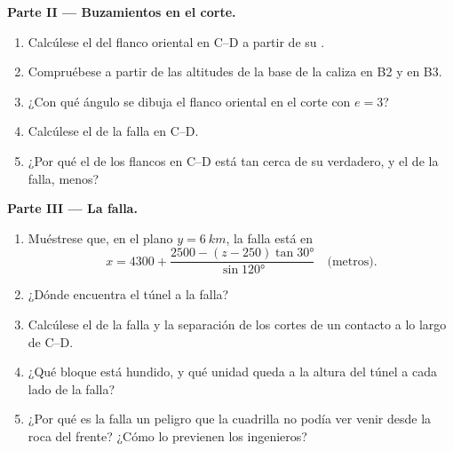 \begin{problem}
\medskip
\noindent\textbf{Parte II --- Buzamientos en el corte.}
\begin{enumerate}[resume]
  \item Calcúlese el  del flanco oriental en C--D a partir de su .
  \item Compruébese a partir de las altitudes de la base de la caliza en B2 y en B3.
  \item ¿Con qué ángulo se dibuja el flanco oriental en el corte con $e = 3$?
  \item Calcúlese el  de la falla en C--D.
  \item ¿Por qué el  de los flancos en C--D está tan cerca de su 
        verdadero, y el de la falla, menos?
\end{enumerate}

\medskip
\noindent\textbf{Parte III --- La falla.}
\begin{enumerate}[resume]
  \item Muéstrese que, en el plano $y = \qty{6}{km}$, la falla está en
        \[ x = 4300 + \frac{2500 - (z - 250)\tan\ang{30}}{\sin\ang{120}}
           \quad\text{(metros)}. \]
  \item ¿Dónde encuentra el túnel a la falla?
  \item Calcúlese el  de la falla y la separación de los cortes de un contacto a lo
        largo de C--D.
  \item ¿Qué bloque está hundido, y qué unidad queda a la altura del túnel a cada lado de la falla?
  \item ¿Por qué es la falla un peligro que la cuadrilla no podía ver venir desde la roca del frente?
        ¿Cómo lo previenen los ingenieros?
\end{enumerate}


\end{problem}
